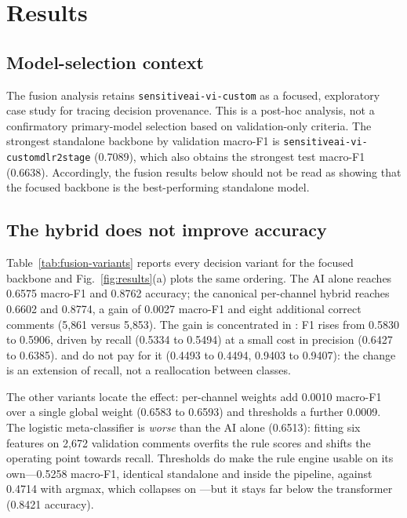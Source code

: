 \section{Results}

\label{sec:results}

\subsection{Model-selection context}

The fusion analysis retains \texttt{sensitiveai-vi-custom} as a focused,
exploratory case study for tracing decision provenance. This is a post-hoc analysis,
not a confirmatory primary-model selection based on validation-only criteria. The
strongest standalone backbone by validation macro-F1 is
\texttt{sensitiveai-vi-customdlr2stage} (0.7089), which also obtains the strongest
test macro-F1 (0.6638). Accordingly, the fusion results below should not be read as
showing that the focused backbone is the best-performing standalone model.

\subsection{The hybrid does not improve accuracy}

\label{sec:no-accuracy-gain}

Table~\ref{tab:fusion-variants} reports every decision variant for the focused
backbone and Fig.~\ref{fig:results}(a) plots the same ordering. The AI alone reaches
0.6575 macro-F1 and 0.8762 accuracy; the canonical per-channel hybrid reaches 0.6602
and 0.8774, a gain of 0.0027 macro-F1 and eight additional correct comments (5{,}861
versus 5{,}853). The gain is concentrated in \hate{}: F1 rises from 0.5830 to 0.5906,
driven by recall (0.5334 to 0.5494) at a small cost in precision (0.6427 to 0.6385).
\off{} and \clean{} do not pay for it (0.4493 to 0.4494, 0.9403 to 0.9407): the
change is an extension of \hate{} recall, not a reallocation between classes.

The other variants locate the effect: per-channel weights add 0.0010 macro-F1 over
a single global weight (0.6583 to 0.6593) and thresholds a further 0.0009. The
logistic meta-classifier is \emph{worse} than the AI alone (0.6513): fitting six
features on 2{,}672 validation comments overfits the rule scores and shifts the
operating point towards \hate{} recall. Thresholds do make the rule engine usable
on its own---0.5258 macro-F1, identical standalone and inside the pipeline, against
0.4714 with argmax, which collapses on \off{}---but it stays far below the
transformer (0.8421 accuracy).


